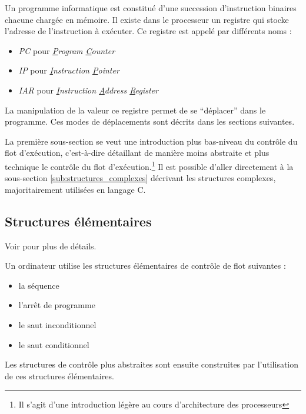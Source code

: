 \documentclass[../../../main.tex]{subfiles}
\begin{document}

Un programme informatique est constitué d'une succession d'instruction binaires chacune chargée en mémoire. Il existe dans le processeur un registre qui stocke l'adresse de l'instruction à exécuter.\newline
Ce registre est appelé par différents noms :
\begin{itemize}
	\item \textit{PC} pour \textit{\underline{P}rogram \underline{C}ounter}
	\item \textit{IP} pour \textit{\underline{I}nstruction \underline{P}ointer}
	\item \textit{IAR} pour \textit{\underline{I}nstruction \underline{A}ddress \underline{R}egister}
\end{itemize}
La manipulation de la valeur ce registre permet de se ``déplacer'' dans le programme. Ces modes de déplacements sont décrits dans les sections suivantes.
 
\begin{minipage}{\textwidth}
	\begin{center}
		
	\end{center}
\end{minipage}
 
La première sous-section se veut une introduction plus bas-niveau du contrôle du flot d'exécution, c'est-à-dire détaillant de manière moins abstraite et plus technique le contrôle du flot d'exécution.\footnote{Il s'agit d'une introduction légère au cours d'architecture des processeurs} Il est possible d'aller directement à la sous-section \ref{sub:structures_complexes} décrivant les structures complexes, majoritairement utilisées en langage C.
\subsection{Structures élémentaires}\label{sub:structures_l_mentaires}
Voir \cite{CSaPP} pour plus de détails.

Un ordinateur utilise les structures élémentaires de contrôle de flot suivantes :
\begin{itemize}
	\item la séquence
	\item l'arrêt de programme
	\item le saut inconditionnel
	\item le saut conditionnel
\end{itemize}
Les structures de contrôle plus abstraites sont ensuite construites par l'utilisation de ces structures élémentaires.
\end{document}
